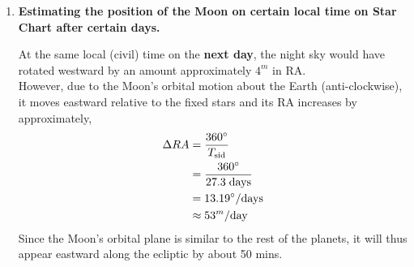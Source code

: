 \documentclass[a4paper,12pt]{extarticle}
\begin{document}
\begin{enumerate}
\begin{sol}
Then, to a first approximation, ignoring distortion from the stereographic projection, the hour angle $HA$ of Mintaka from the zenith is approximately, $HA= 90^\circ \times f$. Then the local sidereal time at the time of the starchart is (right ascension of Mintaka $\alpha=5^h 33^m$) 
\[LST=HA+\alpha\]
Let's take a star chart  that is dated 11 Mar, close to the vernal equinox 21 March, we can take the $LST_{0000}$ at local solar midnight as approximately $12^h-10\times 4^m= 11^h0^m$.\\

Then, to find the local sidereal time at local civil midnight, we need to introduce a correction as Observer's timezone (UTC+LT) is not in alignment with its longitude ($\lambda$),
\begin{align*}
	LST_{0000}'&=LST_{0000}-\Delta LST\\
	&=LST-\left(LT-\frac{\lambda}{360}(24^h)\right)
\end{align*}

Therefore, the time before midnight $\Delta T$ is simply the difference in the local sidereal times at the time of the starchart and at local civil midnight, 
\[\Delta T=LST_{0000}'-LST\]

Therefore, the local time of the star chart is $0000h -\Delta T =$ \textbf{ANSWER}. 
\end{sol}

\item \textbf{Estimating the position of the Moon on certain local time on Star Chart after certain days.}

\begin{sol}
At the same local (civil) time on the \textbf{next day}, the night sky would have rotated westward by an amount approximately $4^m$ in RA.\\

However, due to the Moon's orbital motion about the Earth (anti-clockwise), it moves eastward relative to the fixed stars and its RA increases by approximately,
\begin{align*}
	\Delta RA&=\frac{360^\circ}{T_{\rm sid}}\\
	&=\frac{360^\circ}{27.3\; \rm days}\\
	&=13.19^\circ /\rm days\\
	& \approx 53^m/\rm day
\end{align*}
Since the Moon's orbital plane is similar to the rest of the planets, it will thus appear eastward along the ecliptic by about 50 mins.
\end{sol}


\end{enumerate}
\end{document}
